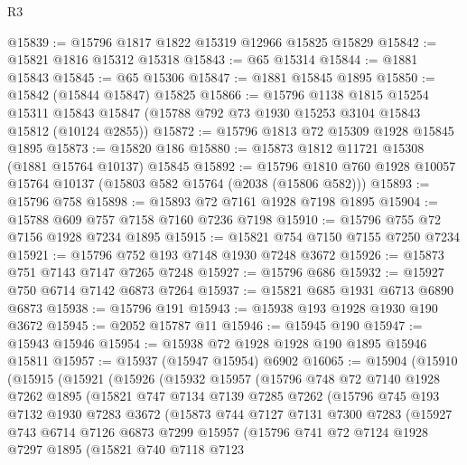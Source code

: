 \begin{lexlean}{R3}
\begin{coremodule}
@15839 := @15796 @1817 @1822 @15319 @12966 @15825 @15829
@15842 := @15821 @1816 @15312 @15318
@15843 := @65 @15314
@15844 := @1881 @15843
@15845 := @65 @15306
@15847 := @1881 @15845 @1895
@15850 := @15842 (@15844 @15847) @15825
@15866 := @15796
    @1138
    @1815
    @15254
    @15311
    @15843
    @15847
    (@15788 @792 @73 @1930 @15253 @3104 @15843 @15812 (@10124 @2855))
@15872 := @15796 @1813 @72 @15309 @1928 @15845 @1895
@15873 := @15820 @186
@15880 := @15873 @1812 @11721 @15308 (@1881 @15764 @10137) @15845
@15892 := @15796 @1810 @760 @1928 @10057 @15764 @10137 (@15803 @582 @15764 (@2038 (@15806 @582)))
@15893 := @15796 @758
@15898 := @15893 @72 @7161 @1928 @7198 @1895
@15904 := @15788 @609 @757 @7158 @7160 @7236 @7198
@15910 := @15796 @755 @72 @7156 @1928 @7234 @1895
@15915 := @15821 @754 @7150 @7155 @7250 @7234
@15921 := @15796 @752 @193 @7148 @1930 @7248 @3672
@15926 := @15873 @751 @7143 @7147 @7265 @7248
@15927 := @15796 @686
@15932 := @15927 @750 @6714 @7142 @6873 @7264
@15937 := @15821 @685 @1931 @6713 @6890 @6873
@15938 := @15796 @191
@15943 := @15938 @193 @1928 @1930 @190 @3672
@15945 := @2052 @15787 @11
@15946 := @15945 @190
@15947 := @15943 @15946
@15954 := @15938 @72 @1928 @1928 @190 @1895 @15946 @15811
@15957 := @15937 (@15947 @15954) @6902
@16065 := @15904
    (@15910
      (@15915
        (@15921
          (@15926
            (@15932
              @15957
              (@15796
                @748
                @72
                @7140
                @1928
                @7262
                @1895
                (@15821
                  @747
                  @7134
                  @7139
                  @7285
                  @7262
                  (@15796
                    @745
                    @193
                    @7132
                    @1930
                    @7283
                    @3672
                    (@15873
                      @744
                      @7127
                      @7131
                      @7300
                      @7283
                      (@15927
                        @743
                        @6714
                        @7126
                        @6873
                        @7299
                        @15957
                        (@15796
                          @741
                          @72
                          @7124
                          @1928
                          @7297
                          @1895
                          (@15821
                            @740
                            @7118
                            @7123

\end{coremodule}
\end{lexlean}
